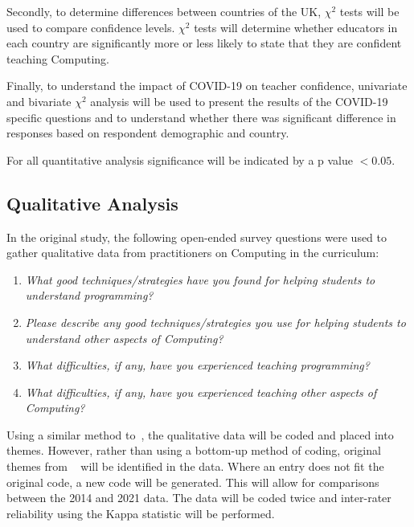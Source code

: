 \documentclass[]{interact}
\theoremstyle{plain}%
\theoremstyle{definition}
\theoremstyle{remark}
\begin{document}
{Secondly, to determine differences between countries of the UK,
$\chi^2$ tests will be used to compare confidence levels. $\chi^2$
tests will determine whether educators in each country are
significantly more or less likely to state that they are confident
teaching Computing.

Finally, to understand the impact of COVID-19 on teacher confidence,
univariate and bivariate $\chi^2$ analysis will be used to present the
results of the COVID-19 specific questions and to understand whether
there was significant difference in responses based on respondent
demographic and country.

For all quantitative analysis significance will be indicated by a p
value $<0.05$.

\subsection{Qualitative Analysis}

In the original study, the following open-ended survey questions were
used to gather qualitative data from practitioners on Computing in the curriculum:  

\begin{enumerate}
\item {\emph{What good techniques/strategies have you found for helping
students to understand programming?}}

\item {\emph{Please describe any good techniques/strategies you use for
helping students to understand other aspects of Computing?}}

\item {\emph{What difficulties, if any, have you experienced teaching
programming?}}

\item {\emph{What difficulties, if any, have you experienced teaching other
aspects of Computing?}}
\end{enumerate}

Using a similar method to~\citeauthor*{sentance+csizmadia:2017}, the
qualitative data will be coded and placed into themes. However, rather
than using a bottom-up method of coding, original themes from
~\citet{sentance+csizmadia:2017} will be identified in the data. Where
an entry does not fit the original code, a new code will be
generated. This will allow for comparisons between the 2014 and 2021
data. The data will be coded twice and inter-rater reliability using
the Kappa statistic will be performed.

}
\end{document}
